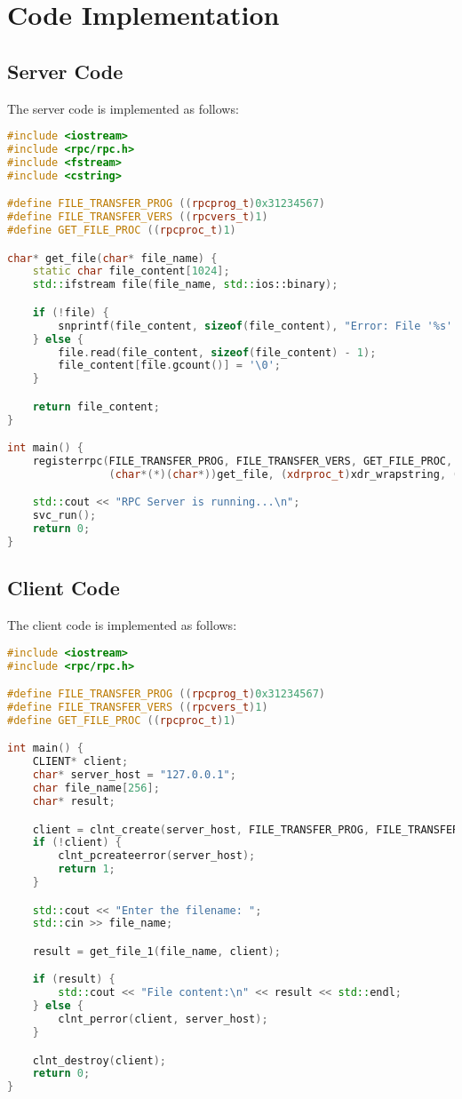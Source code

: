 \documentclass[a4paper,12pt]{article}
\begin{document}
\section{Code Implementation}

\subsection{Server Code}
The server code is implemented as follows:
\begin{lstlisting}[language=C++,caption=RPC Server Code]
#include <iostream>
#include <rpc/rpc.h>
#include <fstream>
#include <cstring>

#define FILE_TRANSFER_PROG ((rpcprog_t)0x31234567)
#define FILE_TRANSFER_VERS ((rpcvers_t)1)
#define GET_FILE_PROC ((rpcproc_t)1)

char* get_file(char* file_name) {
    static char file_content[1024];
    std::ifstream file(file_name, std::ios::binary);

    if (!file) {
        snprintf(file_content, sizeof(file_content), "Error: File '%s' not found", file_name);
    } else {
        file.read(file_content, sizeof(file_content) - 1);
        file_content[file.gcount()] = '\0';
    }

    return file_content;
}

int main() {
    registerrpc(FILE_TRANSFER_PROG, FILE_TRANSFER_VERS, GET_FILE_PROC, 
                (char*(*)(char*))get_file, (xdrproc_t)xdr_wrapstring, (xdrproc_t)xdr_wrapstring);

    std::cout << "RPC Server is running...\n";
    svc_run();
    return 0;
}
\end{lstlisting}

\subsection{Client Code}
The client code is implemented as follows:
\begin{lstlisting}[language=C++,caption=RPC Client Code]
#include <iostream>
#include <rpc/rpc.h>

#define FILE_TRANSFER_PROG ((rpcprog_t)0x31234567)
#define FILE_TRANSFER_VERS ((rpcvers_t)1)
#define GET_FILE_PROC ((rpcproc_t)1)

int main() {
    CLIENT* client;
    char* server_host = "127.0.0.1";
    char file_name[256];
    char* result;

    client = clnt_create(server_host, FILE_TRANSFER_PROG, FILE_TRANSFER_VERS, "udp");
    if (!client) {
        clnt_pcreateerror(server_host);
        return 1;
    }

    std::cout << "Enter the filename: ";
    std::cin >> file_name;

    result = get_file_1(file_name, client);

    if (result) {
        std::cout << "File content:\n" << result << std::endl;
    } else {
        clnt_perror(client, server_host);
    }

    clnt_destroy(client);
    return 0;
}
\end{lstlisting}
\end{document}
